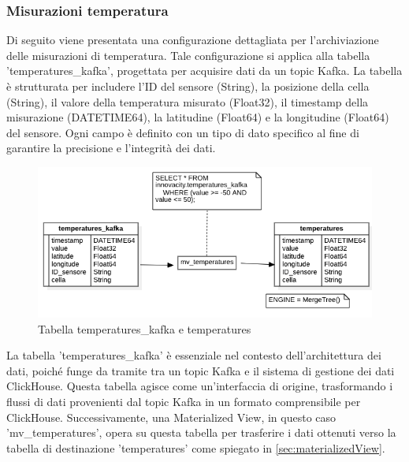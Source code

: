     
    \subsubsection{Misurazioni temperatura} \label{sec:tab_temperatures}
    Di seguito viene presentata una configurazione dettagliata per l'archiviazione delle misurazioni di temperatura. Tale configurazione si applica alla tabella 'temperatures\_kafka', progettata per acquisire dati da un topic Kafka. La tabella è strutturata per includere l'ID del sensore (String), la posizione della cella (String), il valore della temperatura misurato (Float32), il timestamp della misurazione (DATETIME64), la latitudine (Float64) e la longitudine (Float64) del sensore. Ogni campo è definito con un tipo di dato specifico al fine di garantire la precisione e l'integrità dei dati.
    
    \begin{figure}[H]
        \centering
        \includegraphics[width=1\textwidth]{../Images/SpecificaTecnica/temperatures.png}
        \caption{Tabella temperatures\_kafka e temperatures}
        \label{fig:temperatures}
      \end{figure}
    
    La tabella 'temperatures\_kafka' è essenziale nel contesto dell'architettura dei dati, poiché funge da tramite tra un topic Kafka e il sistema di gestione dei dati ClickHouse. Questa tabella agisce come un'interfaccia di origine, trasformando i flussi di dati provenienti dal topic Kafka in un formato comprensibile per ClickHouse. Successivamente, una Materialized View, in questo caso 'mv\_temperatures', opera su questa tabella per trasferire i dati ottenuti verso la tabella di destinazione 'temperatures' come spiegato in \ref{sec:materializedView}.
    
